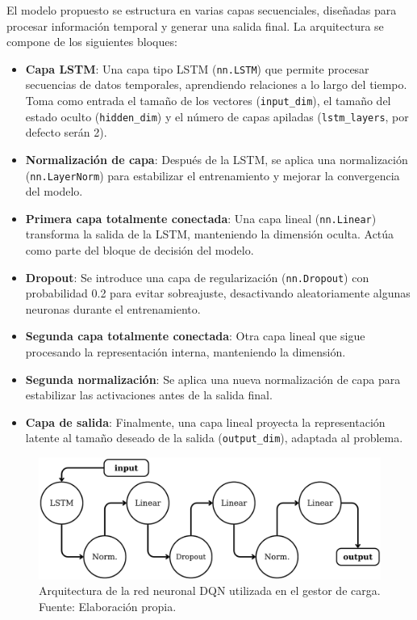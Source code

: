 El modelo propuesto se estructura en varias capas secuenciales, diseñadas para procesar información
temporal y generar una salida final. La arquitectura se compone de los siguientes bloques:
\begin{itemize}
    \item \textbf{Capa LSTM}: Una capa tipo LSTM (\texttt{nn.LSTM}) que permite procesar secuencias 
    de datos temporales, aprendiendo relaciones a lo largo del tiempo. Toma como entrada el tamaño 
    de los vectores (\texttt{input\_dim}), el tamaño del estado oculto (\texttt{hidden\_dim}) y el 
    número de capas apiladas (\texttt{lstm\_layers}, por defecto serán 2).
    
    \item \textbf{Normalización de capa}: Después de la LSTM, se aplica una normalización 
    (\texttt{nn.LayerNorm}) para estabilizar el entrenamiento y mejorar la convergencia del modelo.

    \item \textbf{Primera capa totalmente conectada}: Una capa lineal (\texttt{nn.Linear}) transforma 
    la salida de la LSTM, manteniendo la dimensión oculta. Actúa como parte del bloque de decisión 
    del modelo.

    \item \textbf{Dropout}: Se introduce una capa de regularización (\texttt{nn.Dropout}) con 
    probabilidad 0.2 para evitar sobreajuste, desactivando aleatoriamente algunas neuronas durante 
    el entrenamiento.

    \item \textbf{Segunda capa totalmente conectada}: Otra capa lineal que sigue procesando la 
    representación interna, manteniendo la dimensión.

    \item \textbf{Segunda normalización}: Se aplica una nueva normalización de capa para estabilizar 
    las activaciones antes de la salida final.

    \item \textbf{Capa de salida}: Finalmente, una capa lineal proyecta la representación latente 
    al tamaño deseado de la salida (\texttt{output\_dim}), adaptada al problema.
\end{itemize}

\begin{figure}[H]
    \centering
    \includegraphics[width=1\textwidth]{images/gestor_arch.png}
    \caption{Arquitectura de la red neuronal DQN utilizada en el gestor de carga. Fuente: 
    Elaboración propia.}
    \label{fig:arch_dqn}
\end{figure}

